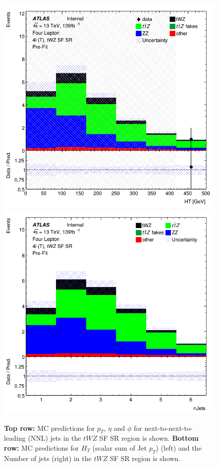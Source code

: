 \begin{figure}[htbp]
    \includegraphics[width=.3\textwidth]{figures/PreFitPlots/lep4_tWZ_4T_SF_HT.png}   \quad
    \includegraphics[width=.3\textwidth]{figures/PreFitPlots/lep4_tWZ_4T_SF_Num_Jets.png}

    \caption{\textbf{Top row:} MC predictions for $p_{T}$, $\eta$ and $\phi$ for next-to-next-to-leading (NNL) jets in the $tWZ$ SF SR region  is shown. \textbf{Bottom row:} MC predictions for $H_{T}$ (scalar sum of Jet $p_{T}$) (left) and the Number of jets (right) in the $tWZ$ SF SR region  is shown.}
    \label{fig:4lep-SF-SR-NNLjetPlots} 
\end{figure}



